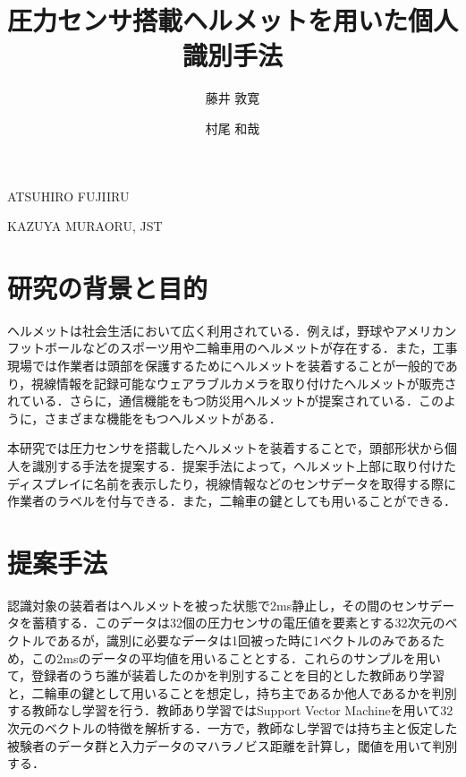 \documentclass[Japanese,noauthor]{dicomopapers}
\begin{document}
\title{圧力センサ搭載ヘルメットを用いた個人識別手法}



\author{藤井 敦寛}{ATSUHIRO FUJII}{RU}
\author{村尾 和哉}{KAZUYA MURAO}{RU, JST}

\maketitle

\section{研究の背景と目的}
ヘルメットは社会生活において広く利用されている．例えば，野球やアメリカンフットボールなどのスポーツ用や二輪車用のヘルメットが存在する．また，工事現場では作業者は頭部を保護するためにヘルメットを装着することが一般的であり，視線情報を記録可能なウェアラブルカメラを取り付けたヘルメットが販売されている．さらに，通信機能をもつ防災用ヘルメット\cite{disaster}が提案されている．このように，さまざまな機能をもつヘルメットがある．
\par
本研究では圧力センサを搭載したヘルメットを装着することで，頭部形状から個人を識別する手法を提案する．提案手法によって，ヘルメット上部に取り付けたディスプレイに名前を表示したり，視線情報などのセンサデータを取得する際に作業者のラベルを付与できる．また，二輪車の鍵としても用いることができる．

\section{提案手法}
認識対象の装着者はヘルメットを被った状態で2ms静止し，その間のセンサデータを蓄積する．このデータは32個の圧力センサの電圧値を要素とする32次元のベクトルであるが，識別に必要なデータは1回被った時に1ベクトルのみであるため，この2msのデータの平均値を用いることとする．これらのサンプルを用いて，登録者のうち誰が装着したのかを判別することを目的とした教師あり学習と，二輪車の鍵として用いることを想定し，持ち主であるか他人であるかを判別する教師なし学習を行う．教師あり学習ではSupport Vector Machineを用いて32次元のベクトルの特徴を解析する．一方で，教師なし学習では持ち主と仮定した被験者のデータ群と入力データのマハラノビス距離を計算し，閾値を用いて判別する．
\end{document}
